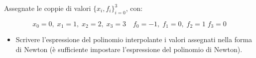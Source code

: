 Assegnate le coppie di valori $\{x_i,f_i \}_{i=0}^3$, con:

\[ x_0=0, \; x_1=1, \; x_2=2, \; x_3=3 \quad f_0=-1, \; f_1=0, \; f_2=1 \; f_3=0 \]

\begin{itemize}
\item Scrivere l'espressione del polinomio interpolante i valori
assegnati nella forma di Newton (\`e sufficiente impostare
l'espressione del polinomio di Newton).
\end{itemize}
